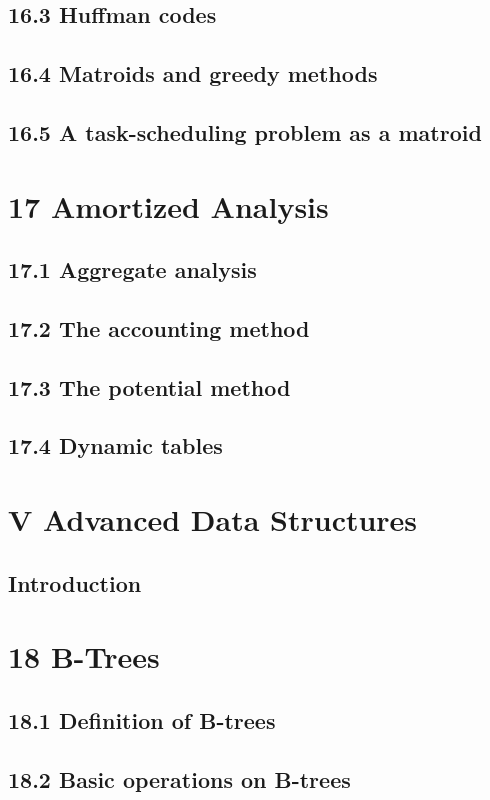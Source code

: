 \documentclass[a4paper]{article}
\begin{document}
\subsection{16.3 Huffman codes}
\subsection{16.4 Matroids and greedy methods}
\subsection{16.5 A task-scheduling problem as a matroid}

\newpage
\section{17 Amortized Analysis}
\subsection{17.1 Aggregate analysis}
\subsection{17.2 The accounting method}
\subsection{17.3 The potential method}
\subsection{17.4 Dynamic tables}

\newpage
\section*{V Advanced Data Structures}
\subsection*{Introduction}

\newpage
\section{18 B-Trees}
\subsection{18.1 Definition of B-trees}
\subsection{18.2 Basic operations on B-trees}
\end{document}
